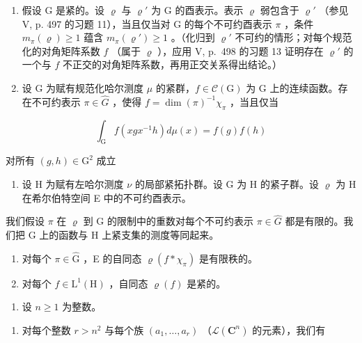 \begin{enumerate}
\def\labelenumi{\arabic{enumi})}
\setcounter{enumi}{17}
\item
  假设 G 是紧的。设 \(\varrho\) 与 \(\varrho'\) 为 G 的酉表示。表示 \(\varrho\) 弱包含于 \(\varrho'\) （参见 V, p. 497 的习题 11），当且仅当对 G 的每个不可约酉表示 \(\pi\) ，条件 \(m_{\pi}(\varrho) \geqslant 1\) 蕴含 \(m_{\pi}(\varrho') \geqslant 1\) 。（化归到 \(\varrho'\) 不可约的情形；对每个规范化的对角矩阵系数 \(f\) （属于 \(\varrho\) ），应用 V, p.~498 的习题 13 证明存在 \(\varrho'\) 的一个与 \(f\) 不正交的对角矩阵系数，再用正交关系得出结论。）
\item
  设 G 为赋有规范化哈尔测度 \(\mu\) 的紧群，\(f \in \mathcal{C}(\mathrm{G})\) 为 G 上的连续函数。存在不可约表示 \(\pi \in \widehat{G}\) ，使得 \(f = \dim(\pi)^{-1}\chi_{\pi}\) ，当且仅当
\end{enumerate}

\[
\int_ {\mathrm{G}} f (x g x ^ {- 1} h) d \mu (x) = f (g) f (h)
\]

对所有 \((g,h)\in \mathrm{G}^2\) 成立

\begin{enumerate}
\def\labelenumi{\arabic{enumi})}
\setcounter{enumi}{19}
\tightlist
\item
  设 H 为赋有左哈尔测度 \(\nu\) 的局部紧拓扑群。设 G 为 H 的紧子群。设 \(\varrho\) 为 H 在希尔伯特空间 E 中的不可约酉表示。
\end{enumerate}

我们假设 \(\pi\) 在 \(\varrho\) 到 G 的限制中的重数对每个不可约表示 \(\pi \in \widehat{G}\) 都是有限的。我们把 G 上的函数与 H 上紧支集的测度等同起来。

\begin{enumerate}
\def\labelenumi{\alph{enumi})}
\item
  对每个 \(\pi \in \widehat{\mathrm{G}}\) ，E 的自同态 \(\varrho(f * \chi_{\pi})\) 是有限秩的。
\item
  对每个 \(f \in \mathrm{L}^{1}(\mathrm{H})\) ，自同态 \(\varrho(f)\) 是紧的。
\end{enumerate}

\begin{enumerate}
\def\labelenumi{\arabic{enumi})}
\setcounter{enumi}{20}
\tightlist
\item
  设 \(n \geqslant 1\) 为整数。
\end{enumerate}

\begin{enumerate}
\def\labelenumi{\alph{enumi})}
\tightlist
\item
  对每个整数 \(r > n^{2}\) 与每个族 \((a_{1}, \ldots, a_{r})\) （\(\mathcal{L}(\mathbf{C}^{n})\) 的元素），我们有
\end{enumerate}

